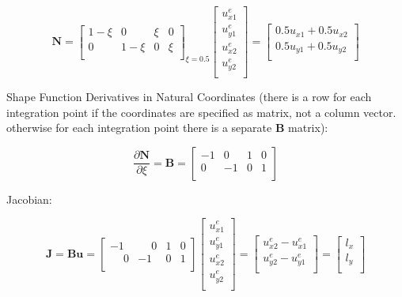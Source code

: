 \documentclass[10pt,b5paper,titlepage]{book}
\newcommand{\m}{\mathbf}
\begin{document}
\begin{equation}
    \m{N} = \begin{bmatrix}
        1 - \xi & 0 & \xi & 0 \\
        0 & 1 - \xi & 0 & \xi \\
    \end{bmatrix}_{\xi = 0.5}
    \begin{bmatrix}
        u_{x1}^e \\
        u_{y1}^e \\
        u_{x2}^e \\
        u_{y2}^e \\
    \end{bmatrix}
    = \begin{bmatrix}
        0.5 u_{x1} + 0.5 u_{x2} \\
        0.5 u_{y1} + 0.5 u_{y2} \\
    \end{bmatrix}
\end{equation}

Shape Function Derivatives in Natural Coordinates (there is a row for each
integration point if the coordinates are specified as matrix, not a column
vector. otherwise for each integration point there is a separate $ \m{B} $
matrix):

\begin{equation}
    \frac{\partial \m{N}}{\partial \xi} =
    \m{B} = \begin{bmatrix}
        -1 & 0 & 1 & 0 \\
        0 & -1 & 0 & 1 \\
    \end{bmatrix}
\end{equation}

Jacobian:

\begin{equation}
    \m{J} = \m{B} \m{u} =
    \begin{bmatrix}
        -1 & \phantom{-}0 & 1 & 0 \\
        \phantom{-}0 & -1 & 0 & 1  \\
    \end{bmatrix}
    \begin{bmatrix}
        u_{x1}^e \\
        u_{y1}^e \\
        u_{x2}^e \\
        u_{y2}^e \\
    \end{bmatrix}
    = \begin{bmatrix}
        u_{x2}^e - u_{x1}^e \\
        u_{y2}^e - u_{y1}^e \\
    \end{bmatrix}
    = \begin{bmatrix}
        l_x \\
        l_y \\
    \end{bmatrix}
\end{equation}
\end{document}
